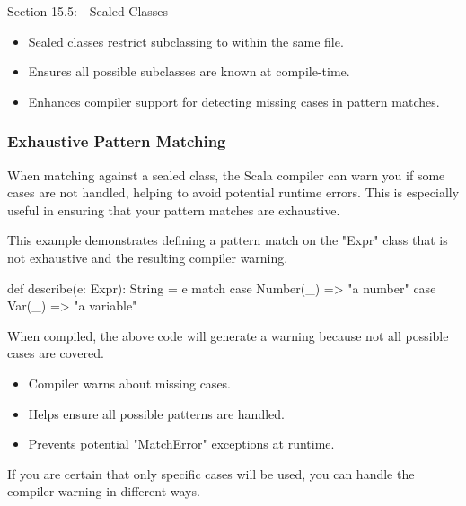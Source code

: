 \begin{notes}{Section 15.5: - Sealed Classes}
\begin{highlight}
        \begin{itemize}
            \item Sealed classes restrict subclassing to within the same file.
            \item Ensures all possible subclasses are known at compile-time.
            \item Enhances compiler support for detecting missing cases in pattern matches.
        \end{itemize}
    
    \end{highlight}
    
    \subsubsection*{Exhaustive Pattern Matching}
    
    When matching against a sealed class, the Scala compiler can warn you if some cases are not handled, helping to avoid potential runtime errors. This is especially useful in ensuring that your pattern matches are exhaustive.
    
    \begin{highlight}
    
        This example demonstrates defining a pattern match on the "Expr" class that is not exhaustive and the resulting compiler warning.
    
    \begin{code}[Scala]
    def describe(e: Expr): String = e match {
        case Number(_) => "a number"
        case Var(_) => "a variable"
    }
    \end{code}
    
        When compiled, the above code will generate a warning because not all possible cases are covered.
        
        \begin{itemize}
            \item Compiler warns about missing cases.
            \item Helps ensure all possible patterns are handled.
            \item Prevents potential "MatchError" exceptions at runtime.
        \end{itemize}
    
    \end{highlight}
    
    If you are certain that only specific cases will be used, you can handle the compiler warning in different ways.
    

\end{notes}
